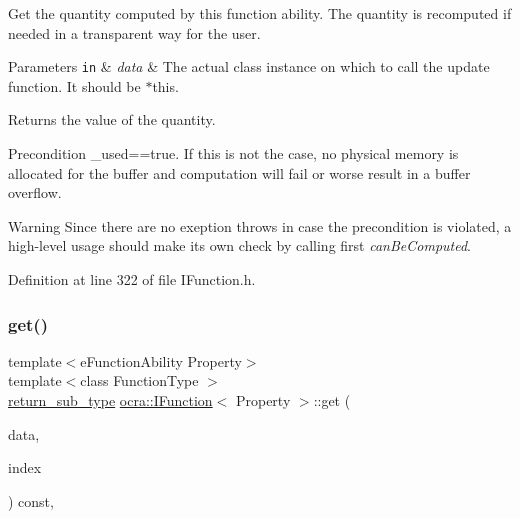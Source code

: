 Get the quantity computed by this function ability. The quantity is recomputed if needed in a transparent way for the user.


\begin{DoxyParams}[1]{Parameters}
\mbox{\tt in}  & {\em data} & The actual class instance on which to call the update function. It should be {\ttfamily $\ast$this}.\\
\hline
\end{DoxyParams}
\begin{DoxyReturn}{Returns}
the value of the quantity.
\end{DoxyReturn}
\begin{DoxyPrecond}{Precondition}
\+\_\+used==true. If this is not the case, no physical memory is allocated for the buffer and computation will fail or worse result in a buffer overflow.
\end{DoxyPrecond}
\begin{DoxyWarning}{Warning}
Since there are no exeption throws in case the precondition is violated, a high-\/level usage should make its own check by calling first {\itshape can\+Be\+Computed}. 
\end{DoxyWarning}


Definition at line 322 of file I\+Function.\+h.

\hypertarget{classocra_1_1IFunction_a53aa631366a527facee4f587ff8f7e09}{}\label{classocra_1_1IFunction_a53aa631366a527facee4f587ff8f7e09} 
\subsubsection{\texorpdfstring{get()}{get()}\hspace{0.1cm}{\footnotesize\ttfamily [2/2]}}
{\footnotesize\ttfamily template$<$e\+Function\+Ability Property$>$ \\
template$<$class Function\+Type $>$ \\
\hyperlink{classocra_1_1IFunction_ac6604adbd04613e1f545fb522cedbe3d}{return\+\_\+sub\+\_\+type} \hyperlink{classocra_1_1IFunction}{ocra\+::\+I\+Function}$<$ Property $>$\+::get (\begin{DoxyParamCaption}\item[{Function\+Type \&}]{data,  }\item[{int}]{index }\end{DoxyParamCaption}) const\hspace{0.3cm}{\ttfamily [inline]}, {\ttfamily [protected]}}

